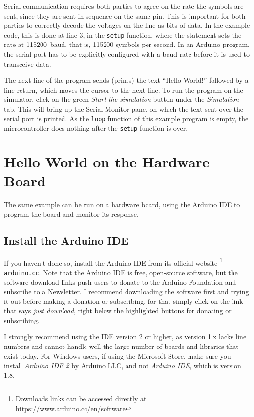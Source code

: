 Serial communication requires both parties to agree on the rate the symbols are sent, since they are sent in sequence on the same pin.
This is important for both parties to correctly decode the voltages on the line as bits of data.
In the example code, this is done at line 3, in the \texttt{setup} function, where the statement  sets the rate at \SI{115200}{baud}, that is, \num{115200} symbols per second.
In an Arduino program, the serial port has to be explicitly configured with a baud rate before it is used to transceive data.

The next line of the program sends (prints) the text ``Hello World!'' followed by a line return, which moves the cursor to the next line.
To run the program on the simulator, click on the green \emph{Start the simulation} button under the \emph{Simulation} tab.
This will bring up the Serial Monitor pane, on which the text sent over the serial port is printed.
As the \texttt{loop} function of this example program is empty, the microcontroller does nothing after the \texttt{setup} function is over.

\section{Hello World on the Hardware Board}

The same example can be run on a hardware board, using the Arduino IDE to program the board and monitor its response.

\subsection{Install the Arduino IDE}
If you haven't done so, install the Arduino IDE from its official website%
\footnote{Downloads links can be accessed directly at \url{https://www.arduino.cc/en/software}}
\texttt{\href{https://www.arduino.cc/en/software}{arduino.cc}}.
Note that the Arduino IDE is free, open-source software, but the software download links push users to donate to the Arduino Foundation and subscribe to a Newsletter.
I recommend downloading the software first and trying it out before making a donation or subscribing, for that simply click on the link that says \emph{just download}, right below the highlighted buttons for donating or subscribing.

I strongly recommend using the IDE version 2 or higher, as version 1.x lacks line numbers and cannot handle  well the large number of boards and libraries that exist today.
For Windows users, if using the Microsoft Store, make sure you install \emph{Arduino IDE 2} by Arduino LLC, and not \emph{Arduino IDE}, which is version 1.8.

